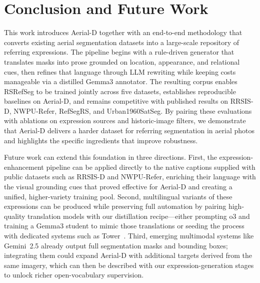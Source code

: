 
\section{Conclusion and Future Work}
\label{sec:conclusion}

This work introduces Aerial-D together with an end-to-end methodology that converts existing aerial segmentation datasets into a large-scale repository of referring expressions. The pipeline begins with a rule-driven generator that translates masks into prose grounded on location, appearance, and relational cues, then refines that language through LLM rewriting while keeping costs manageable via a distilled Gemma3 annotator. The resulting corpus enables RSRefSeg to be trained jointly across five datasets, establishes reproducible baselines on Aerial-D, and remains competitive with published results on RRSIS-D, NWPU-Refer, RefSegRS, and Urban1960SatSeg. By pairing these evaluations with ablations on expression sources and historic-image filters, we demonstrate that Aerial-D delivers a harder dataset for referring segmentation in aerial photos and highlights the specific ingredients that improve robustness.

Future work can extend this foundation in three directions. First, the expression-enhancement pipeline can be applied directly to the native captions supplied with public datasets such as RRSIS-D and NWPU-Refer, enriching their language with the visual grounding cues that proved effective for Aerial-D and creating a unified, higher-variety training pool. Second, multilingual variants of these expressions can be produced while preserving full automation by pairing high-quality translation models with our distillation recipe—either prompting o3 and training a Gemma3 student to mimic those translations or seeding the process with dedicated systems such as Tower~\cite{tower}. Third, emerging multimodal systems like Gemini 2.5\cite{gemini25} already output full segmentation masks and bounding boxes; integrating them could expand Aerial-D with additional targets derived from the same imagery, which can then be described with our expression-generation stages to unlock richer open-vocabulary supervision.
